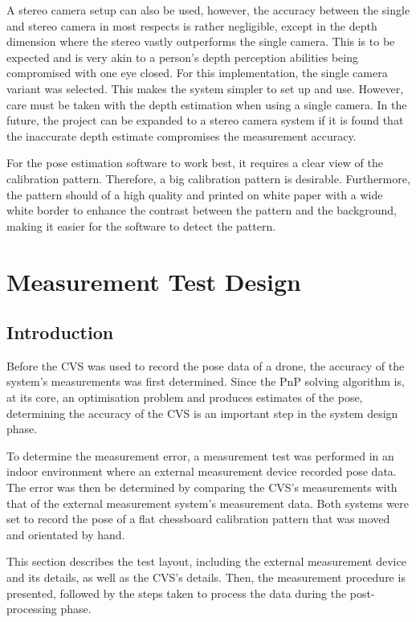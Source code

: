 A stereo camera setup can also be used, however, the accuracy between the single and stereo camera in most respects is rather negligible, except in the depth dimension where the stereo vastly outperforms the single camera. This is to be expected and is very akin to a person's depth perception abilities being compromised with one eye closed. For this implementation, the single camera variant was selected. This makes the system simpler to set up and use. However, care must be taken with the depth estimation when using a single camera. In the future, the project can be expanded to a stereo camera system if it is found that the inaccurate depth estimate compromises the measurement accuracy.

For the pose estimation software to work best, it requires a clear view of the calibration pattern. Therefore, a big calibration pattern is desirable. Furthermore, the pattern should of a high quality and printed on white paper with a wide white border to enhance the contrast between the pattern and the background, making it easier for the software to detect the pattern. 

\section{Measurement Test Design}

\subsection{Introduction}

Before the CVS was used to record the pose data of a drone, the accuracy of the system's measurements was first determined. Since the PnP solving algorithm is, at its core, an optimisation problem and produces estimates of the pose, determining the accuracy of the CVS is an important step in the system design phase. 

To determine the measurement error, a measurement test was performed in an indoor environment where an external measurement device recorded pose data. The error was then be determined by comparing the CVS's measurements with that of the external measurement system's measurement data. Both systems were set to record the pose of a flat chessboard calibration pattern that was moved and orientated by hand.

This section describes the test layout, including the external measurement device and its details, as well as the CVS's details. Then, the measurement procedure is presented, followed by the steps taken to process the data during the post-processing phase. 

